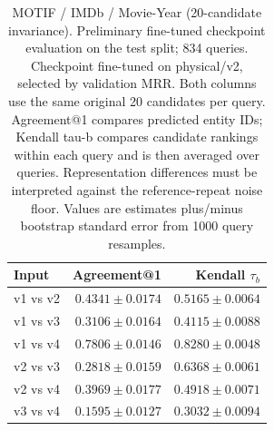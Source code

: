\begin{table}[t]
\centering
\small
\begin{tabular}{lrr}
\toprule
Input & Agreement@1 & Kendall $\tau_b$ \\
\midrule
v1 vs v2 & $0.4341 \pm 0.0174$ & $0.5165 \pm 0.0064$ \\
v1 vs v3 & $0.3106 \pm 0.0164$ & $0.4115 \pm 0.0088$ \\
v1 vs v4 & $0.7806 \pm 0.0146$ & $0.8280 \pm 0.0048$ \\
v2 vs v3 & $0.2818 \pm 0.0159$ & $0.6368 \pm 0.0061$ \\
v2 vs v4 & $0.3969 \pm 0.0177$ & $0.4918 \pm 0.0071$ \\
v3 vs v4 & $0.1595 \pm 0.0127$ & $0.3032 \pm 0.0094$ \\
\bottomrule
\end{tabular}
\caption{MOTIF / IMDb / Movie-Year (20-candidate invariance). Preliminary fine-tuned checkpoint evaluation on the test split; 834 queries. Checkpoint fine-tuned on physical/v2, selected by validation MRR. Both columns use the same original 20 candidates per query. Agreement@1 compares predicted entity IDs; Kendall tau-b compares candidate rankings within each query and is then averaged over queries. Representation differences must be interpreted against the reference-repeat noise floor. Values are estimates plus/minus bootstrap standard error from 1000 query resamples.}
\label{tab:motif-movie_year-invariance}
\end{table}
